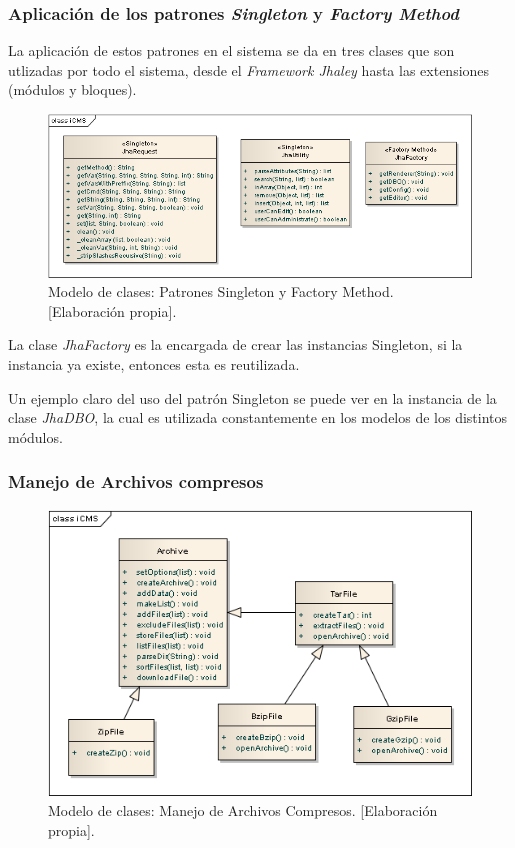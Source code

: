 \subsubsection{Aplicaci\'on de los patrones \textit{Singleton} y \textit{Factory Method}}
La aplicaci\'on de estos patrones en el sistema se da en tres clases que son utlizadas por todo el sistema, desde el \textit{Framework Jhaley} hasta las extensiones (m\'odulos y bloques).\\

\begin{figure}[h]
\centering
\includegraphics[scale=.5, keepaspectratio=true]{imagenes/04_imagen.png}
\caption{Modelo de clases: Patrones Singleton y Factory Method. [Elaboraci\'on propia].}
\end{figure}

La clase \emph{JhaFactory} es la encargada de crear las instancias Singleton, si la instancia ya existe, entonces esta es reutilizada.



Un ejemplo claro del uso del patr\'on Singleton se puede ver en la instancia de la clase \emph{JhaDBO}, la cual es utilizada constantemente en los modelos de los distintos m\'odulos.



\subsubsection{Manejo de Archivos compresos}

\begin{figure}[h]
\centering
\includegraphics[scale=.4, keepaspectratio=true]{imagenes/05_imagen.png}
\caption{Modelo de clases: Manejo de Archivos Compresos. [Elaboraci\'on propia].}
\end{figure}

